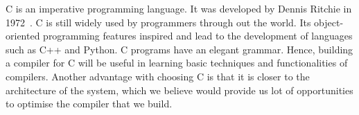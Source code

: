 C is an imperative programming language. It was developed by Dennis 
Ritchie in 1972~\cite{C}. C is still widely used by programmers through out the 
world. Its object-oriented programming features inspired and lead to 
the development of languages such as C++ and Python. C programs have an 
elegant grammar. Hence, building a compiler for C will be useful in 
learning basic techniques and functionalities of compilers. Another 
advantage with choosing C is that it is closer to the architecture
of the system, which we believe would provide us lot of opportunities
to optimise the compiler that we build.